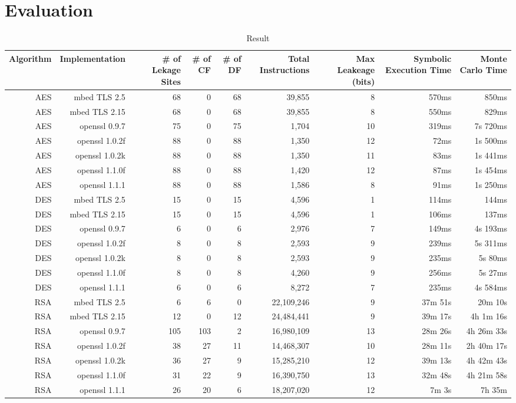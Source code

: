 \section{Evaluation}
\label{res_overview}

\begin{table*}
    \centering
    \caption{Result}
    \label{fig:Test}
    \begin{tabular}{rrrrrrrrr}
      \hline
Algorithm & Implementation & \# of Lekage Sites & \# of CF & \# of DF & Total Instructions & Max Leakeage (bits) & Symbolic Execution Time & Monte Carlo Time\\\hline
AES & mbed TLS 2.5   & 68 & 0 & 68 & 39,855 & 8 & 570ms & 850ms\\
AES & mbed TLS 2.15  & 68 & 0 & 68 & 39,855 & 8 & 550ms & 829ms\\
AES & openssl 0.9.7  & 75 & 0 & 75 & 1,704 & 10 & 319ms & 7s 720ms\\
AES & openssl 1.0.2f & 88 & 0 & 88 & 1,350 & 12 & 72ms & 1s 500ms\\
AES & openssl 1.0.2k & 88 & 0 & 88 & 1,350 & 11 & 83ms & 1s 441ms\\
AES & openssl 1.1.0f & 88 & 0 & 88 & 1,420 & 12 & 87ms & 1s 454ms\\
AES & openssl 1.1.1  & 88 & 0 & 88 & 1,586 & 8 & 91ms & 1s 250ms\\
DES & mbed TLS 2.5   & 15 & 0 & 15 & 4,596 & 1 & 114ms & 144ms\\
DES & mbed TLS 2.15  & 15 & 0 & 15 & 4,596 & 1 & 106ms & 137ms\\
DES & openssl 0.9.7  & 6 & 0 & 6 & 2,976 & 7 & 149ms & 4s 193ms       \\
DES & openssl 1.0.2f & 8 & 0 & 8 & 2,593 & 9 & 239ms & 5s 311ms       \\
DES & openssl 1.0.2k & 8 & 0 & 8 & 2,593 & 9 & 235ms & 5s 80ms        \\
DES & openssl 1.1.0f & 8 & 0 & 8 & 4,260 & 9 & 256ms & 5s 27ms        \\
DES & openssl 1.1.1  & 6 & 0 & 6 & 8,272 & 7 & 235ms & 4s 584ms       \\
RSA & mbed TLS 2.5   & 6 & 6 & 0 & 22,109,246 & 9      & 37m 51s & 20m 10s \\
RSA & mbed TLS 2.15  & 12 & 0 & 12 & 24,484,441 & 9    & 39m 17s & 4h 1m 16s     \\
RSA & openssl 0.9.7  & 105 & 103 & 2 & 16,980,109 & 13 & 28m 26s & 4h 26m 33s \\
RSA & openssl 1.0.2f & 38 & 27 & 11 & 14,468,307 & 10  & 28m 11s & 2h 40m 17s  \\
RSA & openssl 1.0.2k & 36 & 27 & 9 & 15,285,210 & 12   & 39m 13s & 4h 42m 43s   \\
RSA & openssl 1.1.0f & 31 & 22 & 9 & 16,390,750 & 13   & 32m 48s & 4h 21m 58s   \\
RSA & openssl 1.1.1  & 26 & 20 & 6 & 18,207,020 & 12   &  7m  3s & 7h 35m         \\\hline
\end{tabular}
\end{table*}


